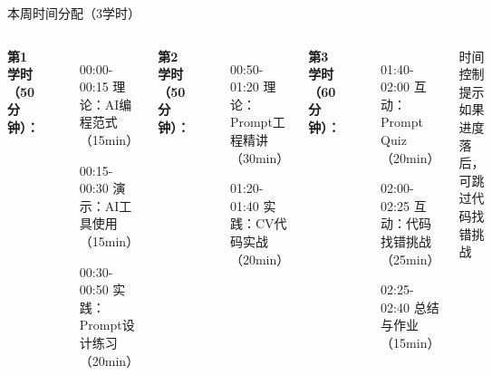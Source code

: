 \documentclass[aspectratio=169, 10pt]{beamer}
\begin{document}
\begin{frame}{本周时间分配（3学时）}
	\begin{columns}
		\textbf{第1学时（50分钟）：}
		\begin{itemize}
			\item[00:00-00:15] 理论：AI编程范式（15min）
			\item[00:15-00:30] 演示：AI工具使用（15min）
			\item[00:30-00:50] 实践：Prompt设计练习（20min）
		\end{itemize}

		\textbf{第2学时（50分钟）：}
		\begin{itemize}
			\item[00:50-01:20] 理论：Prompt工程精讲（30min）
			\item[01:20-01:40] 实践：CV代码实战（20min）
		\end{itemize}

		\textbf{第3学时（60分钟）：}
		\begin{itemize}
			\item[01:40-02:00] 互动：Prompt Quiz（20min）
			\item[02:00-02:25] 互动：代码找错挑战（25min）
			\item[02:25-02:40] 总结与作业（15min）
		\end{itemize}

		\vspace{0.3cm}
		\begin{alertblock}{时间控制提示}
			如果进度落后，可跳过代码找错挑战
		\end{alertblock}
	\end{columns}
\end{frame}
\end{document}
